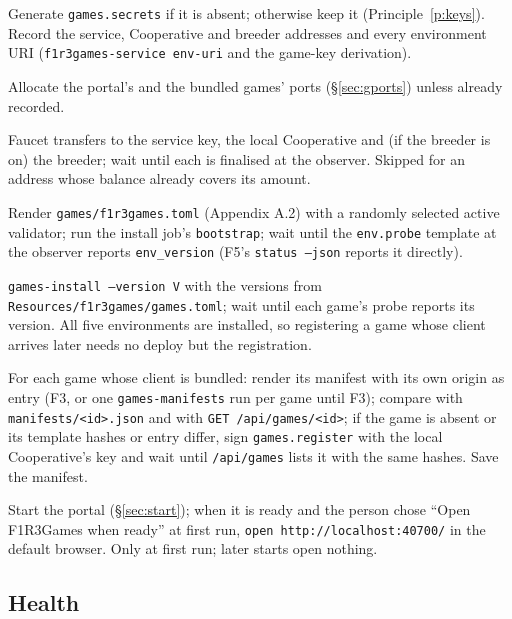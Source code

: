 \documentclass[11pt]{article}
\theoremstyle{definition}
\theoremstyle{remark}
\newcommand{\code}[1]{\texttt{#1}}
\newcommand{\Gm}{F1R3Games}
\begin{document}
\begin{description}[leftmargin=1.5em,style=nextline,itemsep=2pt]
\item[G1 secrets] Generate \code{games.secrets} if it is absent; otherwise keep it
  (Principle~\ref{p:keys}). Record the service, Cooperative and breeder addresses and
  every environment URI (\code{f1r3games-service env-uri} and the game-key
  derivation).
\item[G2 ports] Allocate the portal's and the bundled games' ports
  (\S\ref{sec:gports}) unless already recorded.
\item[G3 fund] Faucet transfers to the service key, the local Cooperative and (if
  the breeder is on) the breeder; wait until each is finalised at the observer.
  Skipped for an address whose balance already covers its amount.
\item[G4 configure and install the portal environment] Render
  \code{games/f1r3games.toml} (Appendix A.2) with a randomly selected active
  validator; run the install job's \code{bootstrap}; wait until the \code{env.probe}
  template at the observer reports \code{env\_version} (F5's
  \code{status --json} reports it directly).
\item[G5 install the game environments] \code{games-install --version V} with the
  versions from \code{Resources/f1r3games/games.toml}; wait until each game's probe
  reports its version. All five environments are installed, so registering a game
  whose client arrives later needs no deploy but the registration.
\item[G6 register] For each game whose client is bundled: render its manifest with
  its own origin as entry (F3, or one \code{games-manifests} run per game until F3);
  compare with \code{manifests/<id>.json} and with \code{GET /api/games/<id>}; if the
  game is absent or its template hashes or entry differ, sign \code{games.register}
  with the local Cooperative's key and wait until \code{/api/games} lists it with the
  same hashes. Save the manifest.
\item[G7 open] Start the portal (\S\ref{sec:start}); when it is ready and the person
  chose ``Open \Gm{} when ready'' at first run, \code{open http://localhost:40700/}
  in the default browser. Only at first run; later starts open nothing.
\end{description}

\subsection{Health}\label{sec:ghealth}
\end{document}
